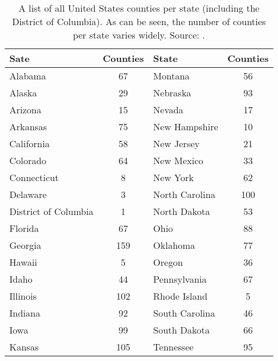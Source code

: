 \begin{table}
\centering
\caption[Number of counties by state]{A list of all United States counties per state (including the District of Columbia). As can be seen, the number of counties per state varies widely. Source: \cite{TFI:2021}.}
\begin{tabular}{|l|c||l|c|}
\hline
\textbf{Sate}        & \textbf{Counties} & \textbf{State} & \textbf{Counties} \\ \hline
Alabama              & 67                & Montana        & 56                \\ \hline
Alaska               & 29                & Nebraska       & 93                \\ \hline
Arizona              & 15                & Nevada         & 17                \\ \hline
Arkansas             & 75                & New Hampshire  & 10                \\ \hline
California           & 58                & New Jersey     & 21                \\ \hline
Colorado             & 64                & New Mexico     & 33                \\ \hline
Connecticut           & 8                 & New York       & 62                \\ \hline
Delaware             & 3                 & North Carolina & 100               \\ \hline
District of Columbia & 1                 & North Dakota   & 53                \\ \hline
Florida              & 67                & Ohio           & 88                \\ \hline
Georgia              & 159               & Oklahoma       & 77                \\ \hline
Hawaii               & 5                 & Oregon         & 36                \\ \hline
Idaho                & 44                & Pennsylvania   & 67                \\ \hline
Illinois             & 102               & Rhode Island   & 5                 \\ \hline
Indiana              & 92                & South Carolina & 46                \\ \hline
Iowa                 & 99                & South Dakota   & 66                \\ \hline
Kansas               & 105               & Tennessee      & 95                \\ \hline

\end{tabular}
\end{table}
